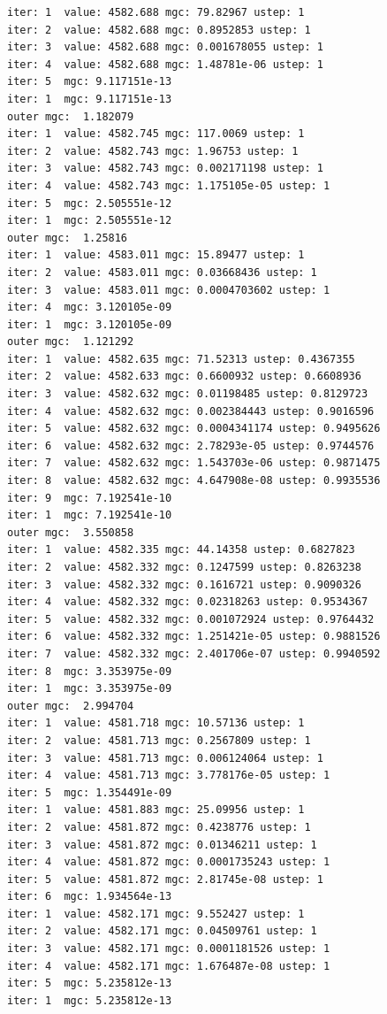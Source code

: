 \documentclass[
  letterpaper,
  DIV=11,
  numbers=noendperiod]{scrartcl}
\begin{document}
\begin{verbatim}
iter: 1  value: 4582.688 mgc: 79.82967 ustep: 1 
iter: 2  value: 4582.688 mgc: 0.8952853 ustep: 1 
iter: 3  value: 4582.688 mgc: 0.001678055 ustep: 1 
iter: 4  value: 4582.688 mgc: 1.48781e-06 ustep: 1 
iter: 5  mgc: 9.117151e-13 
iter: 1  mgc: 9.117151e-13 
outer mgc:  1.182079 
iter: 1  value: 4582.745 mgc: 117.0069 ustep: 1 
iter: 2  value: 4582.743 mgc: 1.96753 ustep: 1 
iter: 3  value: 4582.743 mgc: 0.002171198 ustep: 1 
iter: 4  value: 4582.743 mgc: 1.175105e-05 ustep: 1 
iter: 5  mgc: 2.505551e-12 
iter: 1  mgc: 2.505551e-12 
outer mgc:  1.25816 
iter: 1  value: 4583.011 mgc: 15.89477 ustep: 1 
iter: 2  value: 4583.011 mgc: 0.03668436 ustep: 1 
iter: 3  value: 4583.011 mgc: 0.0004703602 ustep: 1 
iter: 4  mgc: 3.120105e-09 
iter: 1  mgc: 3.120105e-09 
outer mgc:  1.121292 
iter: 1  value: 4582.635 mgc: 71.52313 ustep: 0.4367355 
iter: 2  value: 4582.633 mgc: 0.6600932 ustep: 0.6608936 
iter: 3  value: 4582.632 mgc: 0.01198485 ustep: 0.8129723 
iter: 4  value: 4582.632 mgc: 0.002384443 ustep: 0.9016596 
iter: 5  value: 4582.632 mgc: 0.0004341174 ustep: 0.9495626 
iter: 6  value: 4582.632 mgc: 2.78293e-05 ustep: 0.9744576 
iter: 7  value: 4582.632 mgc: 1.543703e-06 ustep: 0.9871475 
iter: 8  value: 4582.632 mgc: 4.647908e-08 ustep: 0.9935536 
iter: 9  mgc: 7.192541e-10 
iter: 1  mgc: 7.192541e-10 
outer mgc:  3.550858 
iter: 1  value: 4582.335 mgc: 44.14358 ustep: 0.6827823 
iter: 2  value: 4582.332 mgc: 0.1247599 ustep: 0.8263238 
iter: 3  value: 4582.332 mgc: 0.1616721 ustep: 0.9090326 
iter: 4  value: 4582.332 mgc: 0.02318263 ustep: 0.9534367 
iter: 5  value: 4582.332 mgc: 0.001072924 ustep: 0.9764432 
iter: 6  value: 4582.332 mgc: 1.251421e-05 ustep: 0.9881526 
iter: 7  value: 4582.332 mgc: 2.401706e-07 ustep: 0.9940592 
iter: 8  mgc: 3.353975e-09 
iter: 1  mgc: 3.353975e-09 
outer mgc:  2.994704 
iter: 1  value: 4581.718 mgc: 10.57136 ustep: 1 
iter: 2  value: 4581.713 mgc: 0.2567809 ustep: 1 
iter: 3  value: 4581.713 mgc: 0.006124064 ustep: 1 
iter: 4  value: 4581.713 mgc: 3.778176e-05 ustep: 1 
iter: 5  mgc: 1.354491e-09 
iter: 1  value: 4581.883 mgc: 25.09956 ustep: 1 
iter: 2  value: 4581.872 mgc: 0.4238776 ustep: 1 
iter: 3  value: 4581.872 mgc: 0.01346211 ustep: 1 
iter: 4  value: 4581.872 mgc: 0.0001735243 ustep: 1 
iter: 5  value: 4581.872 mgc: 2.81745e-08 ustep: 1 
iter: 6  mgc: 1.934564e-13 
iter: 1  value: 4582.171 mgc: 9.552427 ustep: 1 
iter: 2  value: 4582.171 mgc: 0.04509761 ustep: 1 
iter: 3  value: 4582.171 mgc: 0.0001181526 ustep: 1 
iter: 4  value: 4582.171 mgc: 1.676487e-08 ustep: 1 
iter: 5  mgc: 5.235812e-13 
iter: 1  mgc: 5.235812e-13 

\end{verbatim}
\end{document}
